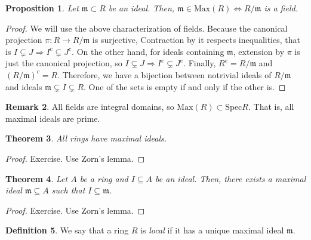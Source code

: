 \documentclass[11pt]{article}
\newtheorem{theorem}{Theorem}[section]
\newtheorem{prop}[theorem]{Proposition}
\theoremstyle{definition}
\newtheorem{defn}[theorem]{Definition}
\newtheorem{rk}[theorem]{Remark}
\begin{document}
        \begin{prop}
            Let $\mathfrak{m} \subset R$ be an ideal.
            Then, $\mathfrak{m} \in \text{Max}(R) \Leftrightarrow R/\mathfrak{m}$ is a field.
        \end{prop}

            \begin{proof}
                We will use the above characterization of fields.
                Because the canonical projection $\pi: R \rightarrow R/\mathfrak{m}$ is surjective,
                Contraction by it respects inequalities, that is $I \subsetneq J \Rightarrow I^c \subsetneq J^c$.
                On the other hand, for ideals containing $\mathfrak{m}$, extension by $\pi$ is just the canonical projection,
                so $I \subsetneq J \Rightarrow I^e \subsetneq J^e$.
                Finally, $R^e = R/\mathfrak{m}$ and $(R/\mathfrak{m})^c = R$.
                Therefore, we have a bijection between notrivial ideals of $R/\mathfrak{m}$
                and ideals $\mathfrak{m} \subsetneq I \subsetneq R$.
                One of the sets is empty if and only if the other is.
            \end{proof}

        \begin{rk}
            All fields are integral domains, so $\text{Max}(R) \subset \text{Spec}R$.
            That is, all maximal ideals are prime.
        \end{rk}

        \begin{theorem}
            All rings have maximal ideals.
        \end{theorem}
            \begin{proof}
                Exercise.
                Use Zorn's lemma.
            \end{proof}

        \begin{theorem}
            Let $A$ be a ring and $I \subseteq A$ be an ideal.
            Then, there exists a maximal ideal $\mathfrak{m} \subseteq A$ such that $I \subseteq \mathfrak{m}$.
        \end{theorem}
            \begin{proof}
                Exercise.
                Use Zorn's lemma.
            \end{proof}

        \begin{defn}
            We say that a ring $R$ is \emph{local} if it has a unique maximal ideal $\mathfrak{m}$.
        \end{defn}
\end{document}
